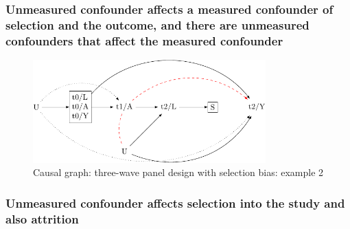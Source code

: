 \documentclass[
  singlecolumn]{report}
\begin{document}
\hypertarget{unmeasured-confounder-affects-a-measured-confounder-of-selection-and-the-outcome-and-there-are-unmeasured-confounders-that-affect-the-measured-confounder}{%
\subsubsection{Unmeasured confounder affects a measured confounder of
selection and the outcome, and there are unmeasured confounders that
affect the measured
confounder}\label{unmeasured-confounder-affects-a-measured-confounder-of-selection-and-the-outcome-and-there-are-unmeasured-confounders-that-affect-the-measured-confounder}}

\begin{figure}

{\centering \includegraphics[width=0.8\textwidth,height=\textheight]{causal-dags_files/figure-pdf/fig-dag-8-2-1.pdf}

}

\caption{\label{fig-dag-8-2}Causal graph: three-wave panel design with
selection bias: example 2}

\end{figure}

\hypertarget{unmeasured-confounder-affects-selection-into-the-study-and-also-attrition}{%
\subsubsection{Unmeasured confounder affects selection into the study
and also
attrition}\label{unmeasured-confounder-affects-selection-into-the-study-and-also-attrition}}
\end{document}
